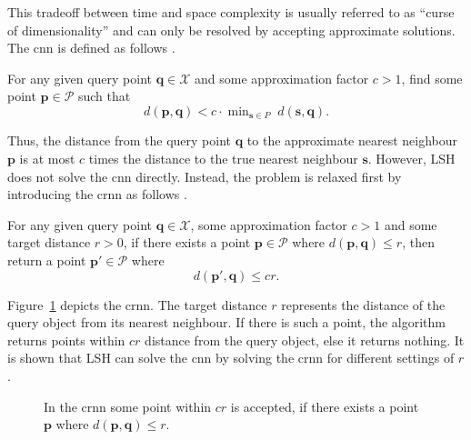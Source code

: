 \documentclass[../../../main.tex]{subfiles}
\begin{document}
This tradeoff between time and space complexity is usually referred to as ``curse of dimensionality'' and can only be resolved by accepting approximate solutions. The \gls{cnn} is defined as follows \cite{indyk_approximate_1998}.

\begin{definition}
    For any given query point $\bm{q} \in \mathcal{X}$ and some approximation factor $c > 1$, find some point $\bm{p} \in \mathcal{P}$ such that
    \begin{equation}
        d(\bm{p},\bm{q}) < c \cdot \mathop{\text{min}}_{\bm{s} \in P} \; d(\bm{s}, \bm{q}).
    \end{equation}
\end{definition}

Thus, the distance from the query point $\bm{q}$ to the approximate nearest neighbour $\bm{p}$ is at most $c$ times the distance to the true nearest neighbour $\bm{s}$. However, LSH does not solve the \gls{cnn} directly. Instead, the problem is relaxed first by introducing the \gls{crnn} as follows \cite{indyk_approximate_1998}.

\begin{definition}
    For any given query point $\bm{q} \in \mathcal{X}$, some approximation factor $c > 1$ and some target distance $r > 0$, if there exists a point $\bm{p} \in \mathcal{P}$ where $d(\bm{p},\bm{q}) \leq r$, then return a point $\bm{p}' \in \mathcal{P}$ where
    \begin{equation}
        d(\bm{p}',\bm{q}) \leq cr.
    \end{equation}
\end{definition}

Figure~\ref{fig:nearest_neighbour} depicts  the \gls{crnn}. The target distance $r$ represents the distance of the query object from its nearest neighbour. If there is such a point, the algorithm returns points within $cr$ distance from the query object, else it returns nothing. It is shown that LSH can solve the \gls{cnn} by solving the \gls{crnn} for different settings of $r$ \cite{indyk_approximate_1998}.

\begin{figure}[t!]
    \centering
    
    \caption{In the \acrlong{crnn} some point within $cr$ is accepted, if there exists a point $\bm{p}$ where $d(\bm{p},\bm{q}) \leq r$.}
    \label{fig:nearest_neighbour}
\end{figure}
\end{document}
